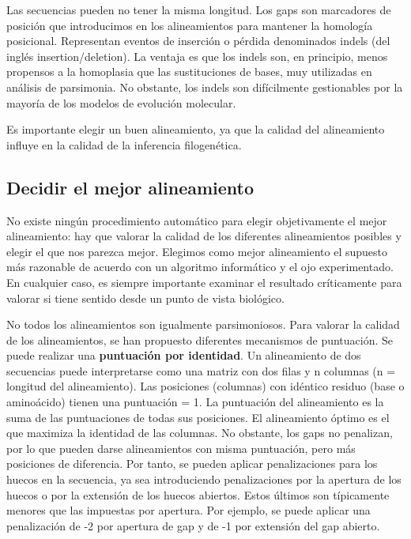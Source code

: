 Las secuencias pueden no tener la misma longitud. Los gaps son marcadores de posición que introducimos en los alineamientos para mantener la homología posicional. Representan eventos de inserción o pérdida denominados indels (del inglés insertion/deletion). La ventaja es que los indels son, en principio, menos propensos a la homoplasia que las sustituciones de bases, muy utilizadas en análisis de parsimonia. No obstante, los indels son difícilmente gestionables por la mayoría de los modelos de evolución molecular. 

Es importante elegir un buen alineamiento, ya que la calidad del alineamiento influye en la calidad de la inferencia filogenética. 


\subsection{Decidir el mejor alineamiento}
No existe ningún procedimiento automático para elegir objetivamente el mejor alineamiento: hay que valorar la calidad de los diferentes alineamientos posibles y elegir el que nos parezca mejor. Elegimos como mejor alineamiento el supuesto más razonable de acuerdo con un algoritmo informático y el ojo experimentado. En cualquier caso, es siempre importante examinar el resultado críticamente para valorar si tiene sentido desde un punto de vista biológico.

No todos los alineamientos son igualmente parsimoniosos. Para valorar la calidad de los alineamientos, se han propuesto diferentes mecanismos de puntuación. Se puede realizar una \textbf{puntuación por identidad}. Un alineamiento de dos secuencias puede interpretarse como una matriz con dos filas y n columnas (n = longitud del alineamiento). Las posiciones (columnas) con idéntico residuo (base o aminoácido) tienen una puntuación = 1. La puntuación del alineamiento es la suma de las puntuaciones de todas sus posiciones. El alineamiento óptimo es el que maximiza la identidad de las columnas. No obstante, los gaps no penalizan, por lo que pueden darse alineamientos con misma puntuación, pero más posiciones de diferencia. Por tanto, se pueden aplicar penalizaciones para los huecos en la secuencia, ya sea introduciendo penalizaciones por la apertura de los huecos o por la extensión de los huecos abiertos. Estos últimos son típicamente menores que las impuestas por apertura. Por ejemplo, se puede aplicar una penalización de -2 por apertura de gap y de -1 por extensión del gap abierto.  

